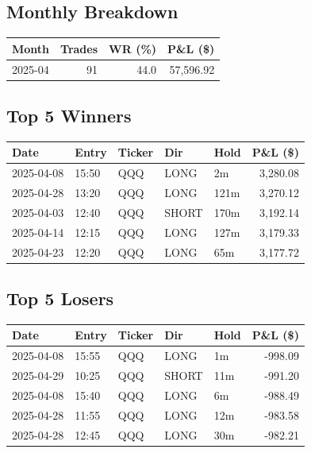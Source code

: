 \documentclass[11pt,a4paper,twoside]{article}
\begin{document}
\subsection{Monthly Breakdown}
\noindent\begin{center}
\begin{tabular}{>{\color{txtmain}}l rrr}
\toprule
\rowcolor{cardbg}
\textbf{Month} & \textbf{Trades} & \textbf{WR (\%)} & \textbf{P\&L (\$)} \\
\midrule
2025-04 & 91 & 44.0 & \textcolor{wingreen}{57,596.92} \\
\bottomrule
\end{tabular}
\end{center}
\subsection{Top 5 Winners}
\noindent\begin{center}
\begin{tabular}{>{\color{txtmain}}l llll r}
\toprule
\rowcolor{cardbg}
\textbf{Date} & \textbf{Entry} & \textbf{Ticker} & \textbf{Dir} & \textbf{Hold} & \textbf{P\&L (\$)} \\
\midrule
2025-04-08 & 15:50 & QQQ & LONG & 2m & \textcolor{wingreen}{3,280.08} \\
2025-04-28 & 13:20 & QQQ & LONG & 121m & \textcolor{wingreen}{3,270.12} \\
2025-04-03 & 12:40 & QQQ & SHORT & 170m & \textcolor{wingreen}{3,192.14} \\
2025-04-14 & 12:15 & QQQ & LONG & 127m & \textcolor{wingreen}{3,179.33} \\
2025-04-23 & 12:20 & QQQ & LONG & 65m & \textcolor{wingreen}{3,177.72} \\
\bottomrule
\end{tabular}
\end{center}
\subsection{Top 5 Losers}
\noindent\begin{center}
\begin{tabular}{>{\color{txtmain}}l llll r}
\toprule
\rowcolor{cardbg}
\textbf{Date} & \textbf{Entry} & \textbf{Ticker} & \textbf{Dir} & \textbf{Hold} & \textbf{P\&L (\$)} \\
\midrule
2025-04-08 & 15:55 & QQQ & LONG & 1m & \textcolor{lossred}{-998.09} \\
2025-04-29 & 10:25 & QQQ & SHORT & 11m & \textcolor{lossred}{-991.20} \\
2025-04-08 & 15:40 & QQQ & LONG & 6m & \textcolor{lossred}{-988.49} \\
2025-04-28 & 11:55 & QQQ & LONG & 12m & \textcolor{lossred}{-983.58} \\
2025-04-28 & 12:45 & QQQ & LONG & 30m & \textcolor{lossred}{-982.21} \\
\bottomrule
\end{tabular}
\end{center}
\clearpage
\end{document}

